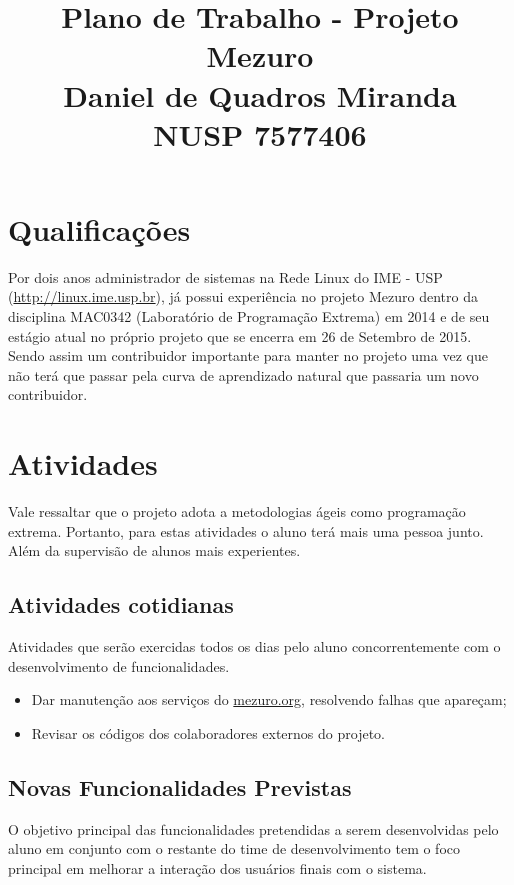 \documentclass[12pt]{article}
\begin{document}
  \title{Plano de Trabalho - Projeto Mezuro\\
         Daniel de Quadros Miranda\\
         NUSP 7577406}

  \maketitle

  \section{Qualificações}
  Por dois anos administrador de sistemas na Rede Linux do IME - USP (\url{http://linux.ime.usp.br}), já possui experiência no projeto Mezuro dentro da disciplina MAC0342 (Laboratório de Programação Extrema) em 2014 e de seu estágio atual no próprio projeto que se encerra em 26 de Setembro de 2015. Sendo assim um contribuidor importante para manter no projeto uma vez que não terá que passar pela curva de aprendizado natural que passaria um novo contribuidor.

  \section{Atividades}
    Vale ressaltar que o projeto adota a metodologias ágeis como programação extrema. Portanto, para estas atividades o aluno terá mais uma pessoa junto. Além da supervisão de alunos mais experientes.

    \subsection{Atividades cotidianas}
      Atividades que serão exercidas todos os dias pelo aluno concorrentemente com o desenvolvimento de funcionalidades.

      \begin{itemize}
        \item Dar manutenção aos serviços do \url{mezuro.org}, resolvendo falhas que apareçam;
        \item Revisar os códigos dos colaboradores externos do projeto.
      \end{itemize}

    \subsection{Novas Funcionalidades Previstas}\label{subsec:func-prev}
      O objetivo principal das funcionalidades pretendidas a serem desenvolvidas pelo aluno em conjunto com o restante do time de desenvolvimento tem o foco principal em melhorar a interação dos usuários finais com o sistema.
\end{document}
